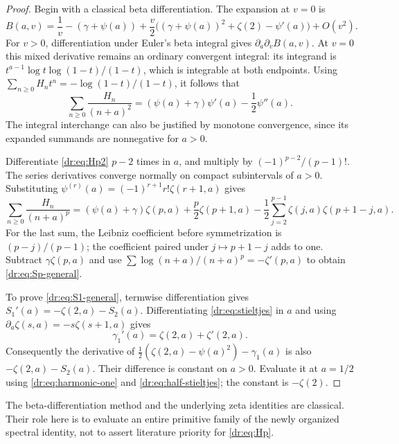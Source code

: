 \documentclass[11pt,letterpaper]{article}
\numberwithin{equation}{section}
\theoremstyle{definition}
\theoremstyle{remark}
\begin{document}
\begin{proof}
Begin with a classical beta differentiation. The expansion at $v=0$ is
\begin{equation}
 B(a,v)=\frac1v-(\gamma+\psi(a))
 +\frac v2\bigl((\gamma+\psi(a))^2+\zeta(2)-\psi'(a)\bigr)
 +O(v^2).
 \label{dr:eq:beta}
\end{equation}
For $v>0$, differentiation under Euler's beta integral gives
$\partial_a\partial_vB(a,v)$. At $v=0$ this mixed derivative remains
an ordinary convergent integral: its integrand is
$t^{a-1}\log t\log(1-t)/(1-t)$, which is integrable at both endpoints.
Using
$\sum_{n\geq0}H_nt^n=-\log(1-t)/(1-t)$, it follows that
\begin{equation}
 \sum_{n\geq0}\frac{H_n}{(n+a)^2}
       =(\psi(a)+\gamma)\psi'(a)-\frac12\psi''(a).
 \label{dr:eq:Hp2}
\end{equation}
The integral interchange can also be justified by monotone convergence,
since its expanded summands are nonnegative for $a>0$.

Differentiate \eqref{dr:eq:Hp2} $p-2$ times in $a$, and multiply by
$(-1)^{p-2}/(p-1)!$. The series derivatives converge normally on compact
subintervals of $a>0$. Substituting
$\psi^{(r)}(a)=(-1)^{r+1}r!\zeta(r+1,a)$ gives
\begin{equation}
 \sum_{n\geq0}\frac{H_n}{(n+a)^p}
 = (\psi(a)+\gamma)\zeta(p,a)+\frac p2\zeta(p+1,a)
 -\frac12\sum_{j=2}^{p-1}\zeta(j,a)\zeta(p+1-j,a).
 \label{dr:eq:Hp}
\end{equation}
For the last sum, the Leibniz coefficient before symmetrization is
$(p-j)/(p-1)$; the coefficient paired under $j\mapsto p+1-j$ adds to
one. Subtract $\gamma\zeta(p,a)$ and use
$\sum\log(n+a)/(n+a)^p=-\zeta'(p,a)$ to obtain
\eqref{dr:eq:Sp-general}.

To prove \eqref{dr:eq:S1-general}, termwise differentiation gives
$S_1'(a)=-\zeta(2,a)-S_2(a)$. Differentiating
\eqref{dr:eq:stieltjes} in $a$ and using
$\partial_a\zeta(s,a)=-s\zeta(s+1,a)$ gives
\begin{equation}
 \gamma_1'(a)=\zeta(2,a)+\zeta'(2,a).
 \label{dr:eq:gamma1-derivative}
\end{equation}
Consequently the derivative of
$\tfrac12(\zeta(2,a)-\psi(a)^2)-\gamma_1(a)$ is also
$-\zeta(2,a)-S_2(a)$. Their difference is constant on $a>0$.
Evaluate it at $a=1/2$ using \eqref{dr:eq:harmonic-one} and
\eqref{dr:eq:half-stieltjes}; the constant is $-\zeta(2)$.
\end{proof}

The beta-differentiation method and the underlying zeta identities are
classical. Their role here is to evaluate an entire primitive family of
the newly organized spectral identity, not to assert literature priority
for \eqref{dr:eq:Hp}.
\end{document}
